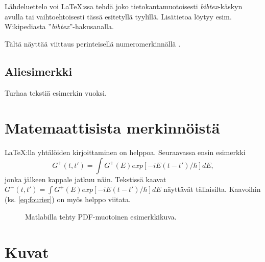 \documentclass[12pt,a4paper,finnish]{vendor/tutthesis}
\begin{document}
Lähdeluettelo voi \LaTeX:ssa tehdä joko tietokantamuotoisesti
\textit{bibtex}-käskyn avulla tai vaihtoehtoisesti tässä esitetyllä tyylillä.
Lisätietoa löytyy esim. Wikipediasta ''\textit{bibtex}''-hakusanalla.

Tältä näyttää viittaus perinteisellä numeromerkinnällä \cite{Hirs,Mittelbach}.

%
%

\subsection{Aliesimerkki}

Turhaa tekstiä esimerkin vuoksi.

\section{Matemaattisista merkinnöistä}

\LaTeX:lla yhtälöiden kirjoittaminen on helppoa. Seuraavassa ensin esimerkki
\begin{equation}
  \label{eq:fourier}
  G^+(t,t')= \int G^+(E) exp[-iE(t-t')/\hbar] dE,
\end{equation}
jonka jälkeen kappale jatkuu näin.
Tekstissä kaavat $G^+(t,t')= \int G^+(E) exp[-iE(t-t')/\hbar] dE$ näyttävät
tällaisilta. Kaavoihin (ks. \ref{eq:fourier}) on myös helppo viitata.

%

\begin{figure}[t]
\begin{center}
\end{center}
\caption{Matlabilla tehty PDF-muotoinen esimerkkikuva.}
\label{fig:esimKuva}
\end{figure}

\section{Kuvat}
\end{document}
